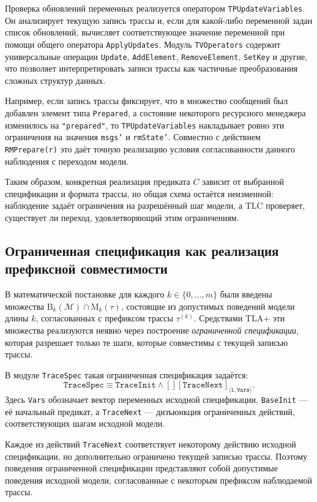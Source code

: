 Проверка обновлений переменных реализуется оператором
\texttt{TPUpdateVariables}. Он анализирует текущую запись трассы и, если для
какой-либо переменной задан список обновлений, вычисляет соответствующее
значение переменной при помощи общего оператора \texttt{ApplyUpdates}. Модуль
\texttt{TVOperators} содержит универсальные операции \texttt{Update},
\texttt{AddElement}, \texttt{RemoveElement}, \texttt{SetKey} и другие, что
позволяет интерпретировать записи трассы как частичные преобразования сложных
структур данных.

Например, если запись трассы фиксирует, что в множество сообщений был добавлен
элемент типа \texttt{Prepared}, а состояние некоторого ресурсного менеджера
изменилось на \texttt{"prepared"}, то \texttt{TPUpdateVariables} накладывает
ровно эти ограничения на значения \texttt{msgs'} и \texttt{rmState'}.
Совместно с действием \texttt{RMPrepare(r)} это даёт точную реализацию условия
согласованности данного наблюдения с переходом модели.

Таким образом, конкретная реализация предиката $C$ зависит от выбранной
спецификации и формата трассы, но общая схема остаётся неизменной:
наблюдение задаёт ограничения на разрешённый шаг модели, а TLC проверяет,
существует ли переход, удовлетворяющий этим ограничениям.

\subsection{Ограниченная спецификация как реализация префиксной совместимости}

В математической постановке для каждого $k \in \{0,\dots,m\}$ были введены
множества $\mathrm{B}_k(\mathcal{M}) \cap \mathrm{M}_k(\tau)$, состоящие из
допустимых поведений модели длины $k$, согласованных с префиксом трассы
$\tau^{(k)}$. Средствами TLA+ эти множества реализуются неявно через построение
\emph{ограниченной спецификации}, которая разрешает только те шаги, которые
совместимы с текущей записью трассы.

В модуле \texttt{TraceSpec} такая ограниченная спецификация задаётся:
\[
\texttt{TraceSpec}
\equiv
\texttt{TraceInit} \land [][\texttt{TraceNext}]_{\langle \texttt{l},
\texttt{Vars} \rangle}.
\]
Здесь \texttt{Vars} обозначает вектор переменных исходной спецификации,
\texttt{BaseInit} --- её начальный предикат, а \texttt{TraceNext} ---
дизъюнкция ограниченных действий, соответствующих шагам исходной модели.

Каждое из действий \texttt{TraceNext} соответствует некоторому действию
исходной спецификации, но дополнительно ограничено текущей записью трассы.
Поэтому поведения ограниченной спецификации представляют собой допустимые
поведения исходной модели, согласованные с некоторым префиксом наблюдаемой
трассы.

